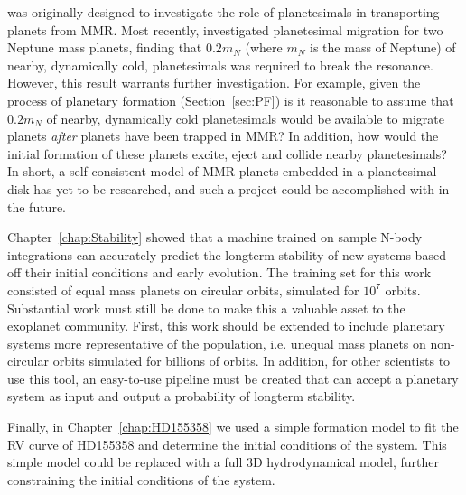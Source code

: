 \hermes was originally designed to investigate the role of planetesimals in transporting planets from MMR. 
Most recently, \citet{Chatterjee2015} investigated planetesimal migration for two Neptune mass planets, finding that $0.2m_N$ (where $m_N$ is the mass of Neptune) of nearby, dynamically cold, planetesimals was required to break the resonance. 
However, this result warrants further investigation. 
For example, given the process of planetary formation (Section~\ref{sec:PF}) is it reasonable to assume that $0.2m_N$ of nearby, dynamically cold planetesimals would be available to migrate planets \textit{after} planets have been trapped in MMR?
In addition, how would the initial formation of these planets excite, eject and collide nearby planetesimals?
In short, a self-consistent model of MMR planets embedded in a planetesimal disk has yet to be researched, and such a project could be accomplished with \hermes in the future.

Chapter~\ref{chap:Stability} showed that a machine trained on sample N-body integrations can accurately predict the longterm stability of new systems based off their initial conditions and early evolution. 
The training set for this work consisted of equal mass planets on circular orbits, simulated for $10^7$ orbits. 
Substantial work must still be done to make this a valuable asset to the exoplanet community.
First, this work should be extended to include planetary systems more representative of the \kep population, i.e. unequal mass planets on non-circular orbits simulated for billions of orbits. 
In addition, for other scientists to use this tool, an easy-to-use pipeline must be created that can accept a planetary system as input and output a probability of longterm stability. 

Finally, in Chapter~\ref{chap:HD155358} we used a simple formation model to fit the RV curve of HD155358 and determine the initial conditions of the system. 
This simple model could be replaced with a full 3D hydrodynamical model, further constraining the initial conditions of the system. 

